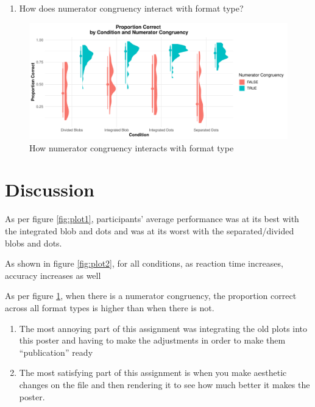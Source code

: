 \documentclass[
  man,floatsintext]{apa6}
\providecommand{\tightlist}{%
  \setlength{\itemsep}{0pt}\setlength{\parskip}{0pt}}
\begin{document}
\clearpage

\begin{enumerate}
\def\labelenumi{\arabic{enumi}.}
\setcounter{enumi}{2}
\tightlist
\item
  How does numerator congruency interact with format type?
\end{enumerate}

\begin{figure}
\centering
\includegraphics{Sebastian_WA11_files/figure-latex/plot3-1.pdf}
\caption{\label{fig:plot3}How numerator congruency interacts with format type}
\end{figure}

\clearpage

\section{Discussion}\label{discussion}

As per figure \ref{fig:plot1}, participants' average performance was at its best with the integrated blob and dots and was at its worst with the separated/divided blobs and dots.

As shown in figure \ref{fig:plot2}, for all conditions, as reaction time increases, accuracy increases as well

As per figure \ref{fig:plot3}, when there is a numerator congruency, the proportion correct across all format types is higher than when there is not.

\begin{enumerate}
\def\labelenumi{\arabic{enumi}.}
\item
  The most annoying part of this assignment was integrating the old plots into this poster and having to make the adjustments in order to make them ``publication'' ready
\item
  The most satisfying part of this assignment is when you make aesthetic changes on the file and then rendering it to see how much better it makes the poster.
\end{enumerate}
\end{document}
